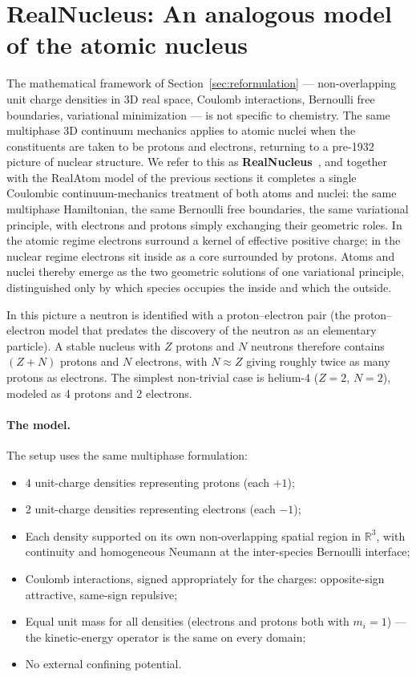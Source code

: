 \documentclass[11pt]{article}
\begin{document}
\section{RealNucleus: An analogous model of the atomic nucleus}\label{sec:nucleus}

The mathematical framework of Section~\ref{sec:reformulation} --- non-overlapping unit charge densities in 3D real space, Coulomb interactions, Bernoulli free boundaries, variational minimization --- is not specific to chemistry. The same multiphase 3D continuum mechanics applies to atomic nuclei when the constituents are taken to be protons and electrons, returning to a pre-1932 picture of nuclear structure. We refer to this as \textbf{RealNucleus}~\cite{RealNucleus}, and together with the RealAtom model of the previous sections it completes a single Coulombic continuum-mechanics treatment of both atoms and nuclei: the same multiphase Hamiltonian, the same Bernoulli free boundaries, the same variational principle, with electrons and protons simply exchanging their geometric roles. In the atomic regime electrons surround a kernel of effective positive charge; in the nuclear regime electrons sit inside as a core surrounded by protons. Atoms and nuclei thereby emerge as the two geometric solutions of one variational principle, distinguished only by which species occupies the inside and which the outside.

In this picture a neutron is identified with a proton--electron pair (the proton--electron model that predates the discovery of the neutron as an elementary particle). A stable nucleus with $Z$ protons and $N$ neutrons therefore contains $(Z+N)$ protons and $N$ electrons, with $N \approx Z$ giving roughly twice as many protons as electrons. The simplest non-trivial case is helium-4 ($Z=2$, $N=2$), modeled as 4 protons and 2 electrons.

\paragraph{The model.}
The setup uses the same multiphase formulation:
\begin{itemize}
\item 4 unit-charge densities representing protons (each $+1$);
\item 2 unit-charge densities representing electrons (each $-1$);
\item Each density supported on its own non-overlapping spatial region in $\mathbb{R}^3$, with continuity and homogeneous Neumann at the inter-species Bernoulli interface;
\item Coulomb interactions, signed appropriately for the charges: opposite-sign attractive, same-sign repulsive;
\item Equal unit mass for all densities (electrons and protons both with $m_i = 1$) --- the kinetic-energy operator is the same on every domain;
\item No external confining potential.
\end{itemize}
\end{document}
